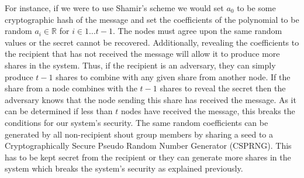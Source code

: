\documentclass[ %
                    author={Luke Murray},
                supervisor={Dr. Simon Hollis},
                     title={Shadow Peer-to-Peer Networks},
                  subtitle={},
                    degree={MEng},
                      year={2013} ]{thesis}
\begin{document}
For instance, if we were to use Shamir's scheme\cite{Shamir} we would set $a_0$ to be some cryptographic hash of the message and set the coefficients of the polynomial to be random $a_i \in \mathbb{R}$ for $i \in {1 \ldots t-1}$. The nodes must agree upon the same random values or the secret cannot be recovered. Additionally, revealing the coefficients to the recipient that has not received the message will allow it to produce more shares in the system. Thus, if the recipient is an adversary, they can simply produce $t-1$ shares to combine with any given share from another node. If the share from a node combines with the $t-1$ shares to reveal the secret then the adversary knows that the node sending this share has received the message. As it can be determined if less than $t$ nodes have received the message, this breaks the conditions for our system's security. The same random coefficients can be generated by all non-recipient shout group members by sharing a seed to a Cryptographically Secure Pseudo Random Number Generator (CSPRNG). This has to be kept secret from the recipient or they can generate more shares in the system which breaks the system's security as explained previously.
\end{document}
